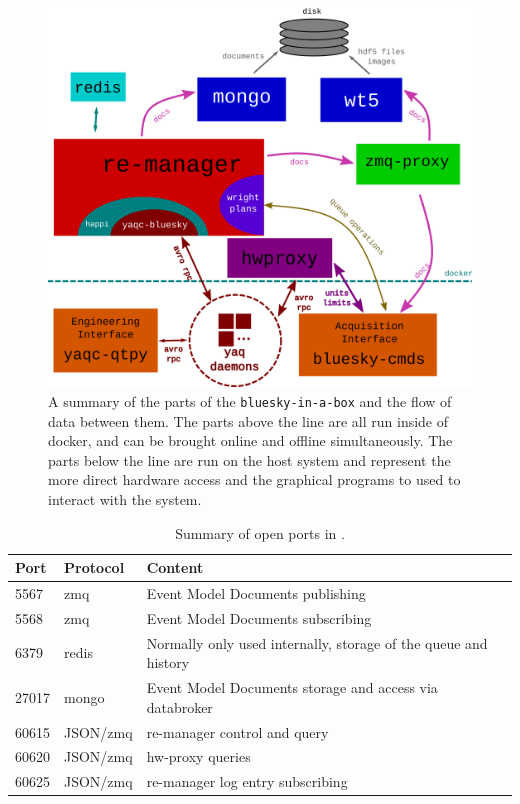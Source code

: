 \begin{figure}
\includegraphics[width=\textwidth]{"acquisition/images/bluesky-in-a-box-architecture"}
\caption[\texttt{bluesky-in-a-box} architecture]{
A summary of the parts of the \texttt{bluesky-in-a-box} and the flow of data between them.
The parts above the line are all run inside of docker, and can be brought online and offline simultaneously.
The parts below the line are run on the host system and represent the more direct hardware access and the graphical programs to used to interact with the system.
}
\label{acq:fig:biab_arch}
\end{figure}

\begin{table}
\centering
\begin{tabular}{lll}
\hline
Port  & Protocol & Content    \\ \hline
5567  & zmq      & Event Model Documents publishing   \\
5568  & zmq      & Event Model Documents subscribing    \\
6379  & redis    & Normally only used internally, storage of the queue and history    \\
27017 & mongo    & Event Model Documents storage and access via databroker \\
60615 & JSON/zmq & re-manager control and query    \\
60620 & JSON/zmq & hw-proxy queries    \\
60625 & JSON/zmq & re-manager log entry subscribing    \\ \hline
\end{tabular}
	\caption[\biab{} Ports]{Summary of open ports in \biab{}.}
	\label{acq:tab:biab_ports}
\end{table}

